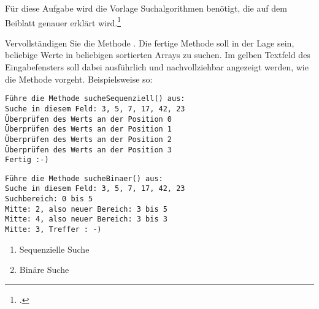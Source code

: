 \documentclass{bschlangaul-aufgabe}
\begin{document}

Für diese Aufgabe wird die Vorlage Suchalgorithmen benötigt, die auf dem
Beiblatt genauer erklärt wird.\footcite[Diese Aufgabe stammt aus dem
Übungsblatt 1 zu Algorithmen und Datenstrukturen von Prof. Dr. Martin
Hennecke und Rainer Gall an der Universität Würzburg und wurde
dankenswerterweise zur Verwendung in diesem Aufgabenblatt zur Verfügung
gestellt., Aufgabe 3]{aud:ab:2}

Vervollständigen Sie die Methode . Die fertige
Methode soll in der Lage sein, beliebige Werte in beliebigen sortierten
Arrays zu suchen. Im gelben Textfeld des Eingabefensters soll dabei
ausführlich und nachvollziehbar angezeigt werden, wie die Methode
vorgeht. Beispielsweise so:

{
\tiny
\begin{multicols}{2}
\begin{verbatim}
Führe die Methode sucheSequenziell() aus:
Suche in diesem Feld: 3, 5, 7, 17, 42, 23
Überprüfen des Werts an der Position 0
Überprüfen des Werts an der Position 1
Überprüfen des Werts an der Position 2
Überprüfen des Werts an der Position 3
Fertig :-)
\end{verbatim}

\begin{verbatim}
Führe die Methode sucheBinaer() aus:
Suche in diesem Feld: 3, 5, 7, 17, 42, 23
Suchbereich: 0 bis 5
Mitte: 2, also neuer Bereich: 3 bis 5
Mitte: 4, also neuer Bereich: 3 bis 3
Mitte: 3, Treffer : -)
\end{verbatim}
\end{multicols}
}

\begin{enumerate}
\item Sequenzielle Suche

\begin{bAntwort}
\end{bAntwort}

\item Binäre Suche

\begin{bAntwort}
\end{bAntwort}

\end{enumerate}
\end{document}
